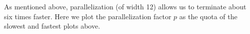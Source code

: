 \documentclass[a4paper]{article}
\begin{document}
\begin{center}
\begin{tabular}{rl}
\\
\end{tabular}
\end{center}
\begin{multicols}{2}
As mentioned above, parallelization (of width 12) allows us to terminate about six times faster. Here we plot the parallelization factor $p$ as the quota of the slowest and fastest plots above.

\columnbreak

\end{multicols}
\end{document}
